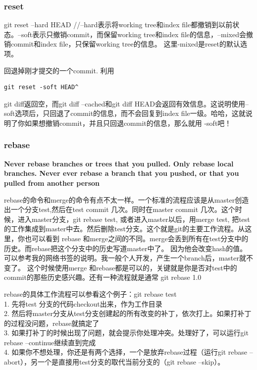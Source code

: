 \documentclass[a4paper,12pt,twoside]{book}
\begin{document}
\begin{CJK*}{UTF8}{song}
\subsubsection{reset}
git reset –hard HEAD //–hard表示将working tree和index file都撤销到以前状态。–soft表示只撤销commit，而保留working tree和index file的信息，–mixed会撤销commit和index file，只保留working tree的信息。 这里-mixed是reset的默认选项。

回退掉刚才提交的一个commit. 利用
\begin{verbatim}
git reset -soft HEAD^
\end{verbatim}
git diff返回空，而git diff –cached和git diff HEAD会返回有效信息。这说明使用–soft选项后，只回退了commit的信息，而不会回复到index file一级。哈哈，这就说明了你如果想撤销commit，并且只回退commit的信息，那么就用 -soft吧！

\subsubsection{rebase}
\textbf{Never rebase branches or trees that you pulled. Only rebase local branches. Never ever rebase a branch that you pushed, or that you pulled from another person} \par
rebase的命令和merge的命令有点不太一样。一个标准的流程应该是从master创造出一个分支test,然后在test commit 几次。同时在master commit 几次。这个时候，进入master分支，git rebase test, 或者进入master以后，用merge test, 把test的工作集成到master中去。然后删除test分支。这个就是git的主要工作流程。从这里，你也可以看到 rebase 和merge之间的不同。merge会丢到所有在test分支中的历史。而rebase把这个分支中的历史写道master中了。
 因为他会改变hash的值。可以参考我的网络书签的说明。我一般个人开发，产生一个branch后，master就不变了。 这个时候使用merge 和rebase都是可以的，关键就是你是否对test中的commit的那些历史感兴趣。还有一种流程就是通常 git rebase 1.0

rebase的具体工作流程可以参看这个例子：git rebase test \\
1. 先将test 分支的代码checkout出来，作为工作目录 \\
2. 然后将master分支从test分支创建起的所有改变的补丁，依次打上。如果打补丁的过程没问题，rebase就搞定了 \\
3. 如果打补丁的时候出现了问题，就会提示你处理冲突。处理好了，可以运行git rebase –continue继续直到完成 \\
4. 如果你不想处理，你还是有两个选择，一个是放弃rebase过程（运行git rebase –abort），另一个是直接用test分支的取代当前分支的（git rebase –skip）。 \\


\end{CJK*}
\end{document}

